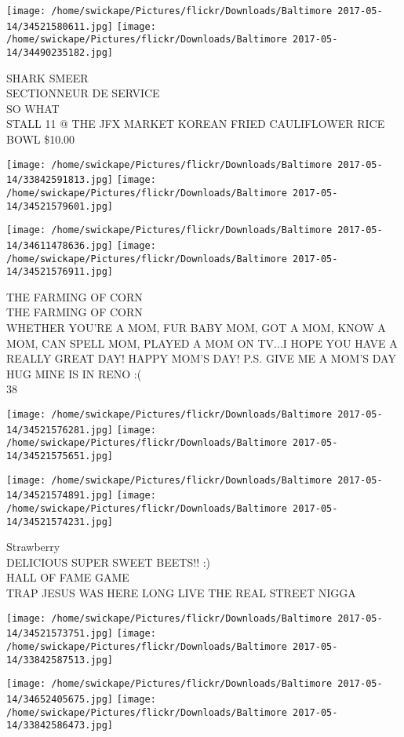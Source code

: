 \documentclass[10pt,letterpaper]{article}
\begin{document}
\texttt{[image: /home/swickape/Pictures/flickr/Downloads/Baltimore 2017-05-14/34521580611.jpg]}
\texttt{[image: /home/swickape/Pictures/flickr/Downloads/Baltimore 2017-05-14/34490235182.jpg]}

SHARK SMEER\\
SECTIONNEUR DE SERVICE\\
SO WHAT\\
STALL 11 @ THE JFX MARKET KOREAN FRIED CAULIFLOWER RICE BOWL \$10.00
\pagebreak

\texttt{[image: /home/swickape/Pictures/flickr/Downloads/Baltimore 2017-05-14/33842591813.jpg]}
\texttt{[image: /home/swickape/Pictures/flickr/Downloads/Baltimore 2017-05-14/34521579601.jpg]}

\texttt{[image: /home/swickape/Pictures/flickr/Downloads/Baltimore 2017-05-14/34611478636.jpg]}
\texttt{[image: /home/swickape/Pictures/flickr/Downloads/Baltimore 2017-05-14/34521576911.jpg]}

THE FARMING OF CORN\\
THE FARMING OF CORN\\
WHETHER YOU'RE A MOM, FUR BABY MOM, GOT A MOM, KNOW A MOM, CAN SPELL MOM, PLAYED A MOM ON TV...I HOPE YOU HAVE A REALLY GREAT DAY!  HAPPY MOM'S DAY!  P.S. GIVE ME A MOM'S DAY HUG MINE IS IN RENO :(\\
38
\pagebreak

\texttt{[image: /home/swickape/Pictures/flickr/Downloads/Baltimore 2017-05-14/34521576281.jpg]}
\texttt{[image: /home/swickape/Pictures/flickr/Downloads/Baltimore 2017-05-14/34521575651.jpg]}

\texttt{[image: /home/swickape/Pictures/flickr/Downloads/Baltimore 2017-05-14/34521574891.jpg]}
\texttt{[image: /home/swickape/Pictures/flickr/Downloads/Baltimore 2017-05-14/34521574231.jpg]}

Strawberry\\
DELICIOUS SUPER SWEET BEETS!! :)\\
HALL OF FAME GAME\\
TRAP JESUS WAS HERE LONG LIVE THE REAL STREET NIGGA
\pagebreak

\texttt{[image: /home/swickape/Pictures/flickr/Downloads/Baltimore 2017-05-14/34521573751.jpg]}
\texttt{[image: /home/swickape/Pictures/flickr/Downloads/Baltimore 2017-05-14/33842587513.jpg]}

\texttt{[image: /home/swickape/Pictures/flickr/Downloads/Baltimore 2017-05-14/34652405675.jpg]}
\texttt{[image: /home/swickape/Pictures/flickr/Downloads/Baltimore 2017-05-14/33842586473.jpg]}
\end{document}
